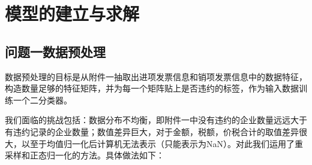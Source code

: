 \documentclass{cumcmthesis}
\begin{document}
\section{模型的建立与求解}
\subsection{问题一数据预处理}
数据预处理的目标是从附件一抽取出进项发票信息和销项发票信息中的数据特征，构造数量足够的特征矩阵，并为每一个矩阵贴上是否违约的标签，作为输入数据训练一个二分类器。

我们面临的挑战包括：数据分布不均衡，即附件一中没有违约的企业数量远远大于有违约记录的企业数量；数值差异巨大，对于金额，税额，价税合计的取值差异很大，以至于均值归一化后计算机无法表示（只能表示为NaN）。对此我们运用了重采样和正态归一化的方法。具体做法如下：
\end{document}
